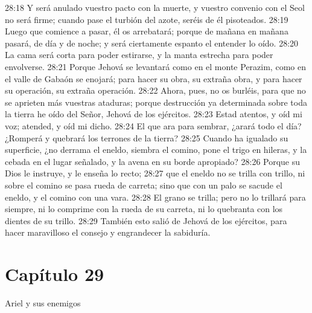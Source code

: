 28:18 Y será anulado vuestro pacto con la muerte, y vuestro convenio con el Seol no será firme; cuando pase el turbión del azote, seréis de él pisoteados. 
28:19 Luego que comience a pasar, él os arrebatará; porque de mañana en mañana pasará, de día y de noche; y será ciertamente espanto el entender lo oído. 
28:20 La cama será corta para poder estirarse, y la manta estrecha para poder envolverse. 
28:21 Porque Jehová se levantará como en el monte Perazim, como en el valle de Gabaón se enojará; para hacer su obra, su extraña obra, y para hacer su operación, su extraña operación. 
28:22 Ahora, pues, no os burléis, para que no se aprieten más vuestras ataduras; porque destrucción ya determinada sobre toda la tierra he oído del Señor, Jehová de los ejércitos. 
28:23 Estad atentos, y oíd mi voz; atended, y oíd mi dicho. 
28:24 El que ara para sembrar, ¿arará todo el día? ¿Romperá y quebrará los terrones de la tierra? 
28:25 Cuando ha igualado su superficie, ¿no derrama el eneldo, siembra el comino, pone el trigo en hileras, y la cebada en el lugar señalado, y la avena en su borde apropiado? 
28:26 Porque su Dios le instruye, y le enseña lo recto; 
28:27 que el eneldo no se trilla con trillo, ni sobre el comino se pasa rueda de carreta; sino que con un palo se sacude el eneldo, y el comino con una vara. 
28:28 El grano se trilla; pero no lo trillará para siempre, ni lo comprime con la rueda de su carreta, ni lo quebranta con los dientes de su trillo. 
28:29 También esto salió de Jehová de los ejércitos, para hacer maravilloso el consejo y engrandecer la sabiduría. 
\section*{Capítulo 29 }
Ariel y sus enemigos 
 
